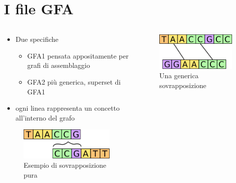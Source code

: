 \documentclass{beamer}
\begin{document}
 
 \section{I file GFA}
 \begin{frame}[fragile]{\secname}
 	\begin{columns}[b, onlytextwidth]
 		\begin{column}{0.7\textwidth}
 			\begin{itemize}
				\item Due specifiche
					\begin{itemize}
							\item GFA1 pensata appositamente per grafi di assemblaggio
							\item GFA2 più generica, superset di GFA1
					\end{itemize}					
				\item ogni linea rappresenta un concetto
					all'interno del grafo
 			\end{itemize}
 			\begin{figure}
 				\centering
 				\captionsetup{justification=centering}
 				\includegraphics[scale=0.30]{dov_ov_++}
 				\caption{Esempio di sovrapposizione pura}
 			\end{figure}
 		\end{column}
 		\begin{column}{0.3\textwidth}
 			\begin{figure}
 				\centering
 				\captionsetup{justification=centering}
 				\includegraphics[scale=0.27]{generic-overlap}
 				\caption{Una generica sovrapposizione}
 			\end{figure}
 		\end{column}
 	\end{columns}
 \end{frame}
 
\end{document}
